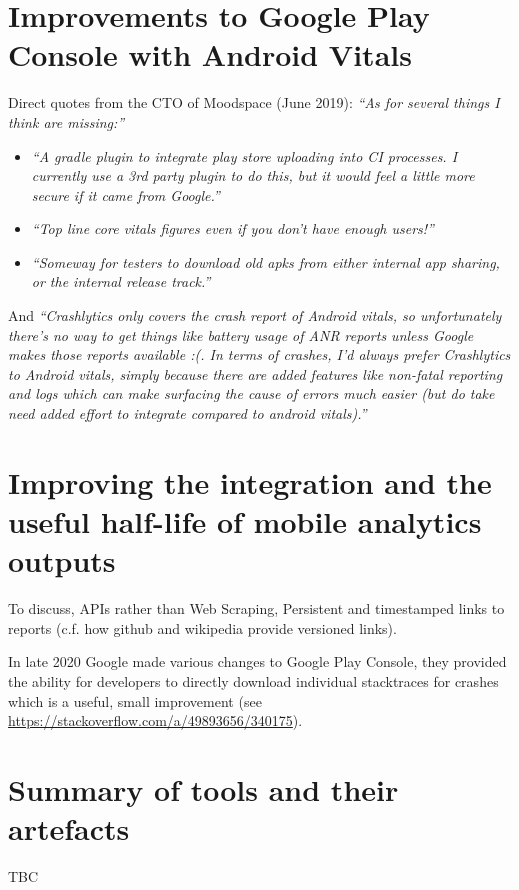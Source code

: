\section{Improvements to Google Play Console with Android Vitals}

Direct quotes from the CTO of Moodspace (June 2019): \emph{``As for several things I think are missing:''}
\begin{itemize}
    \item \textit{``A gradle plugin to integrate play store uploading into CI processes. I currently use a 3rd party plugin to do this, but it would feel a little more secure if it came from Google.''}
    \item \textit{``Top line core vitals figures even if you don't have enough users!''}
    \item \textit{``Someway for testers to download old apks from either internal app sharing, or the internal release track.''}
\end{itemize}

And \emph{``Crashlytics only covers the crash report of Android vitals, so unfortunately there's no way to get things like battery usage of ANR reports unless Google makes those reports available :(. In terms of crashes, I'd always prefer Crashlytics to Android vitals, simply because there are added features like non-fatal reporting and logs which can make surfacing the cause of errors much easier (but do take need added effort to integrate compared to android vitals).''}

\section{Improving the integration and the useful half-life of mobile analytics outputs}
To discuss, APIs rather than Web Scraping, Persistent and timestamped links to reports (c.f. how github and wikipedia provide versioned links).

In late 2020 Google made various changes to Google Play Console, they provided the ability for developers to directly download individual stacktraces for crashes~\citep{stackoverflow2018_how_can_i_get_app_crash_log_from_google_play_console} which is a useful, small improvement (see \url{https://stackoverflow.com/a/49893656/340175}).


\section{Summary of tools and their artefacts}
TBC
